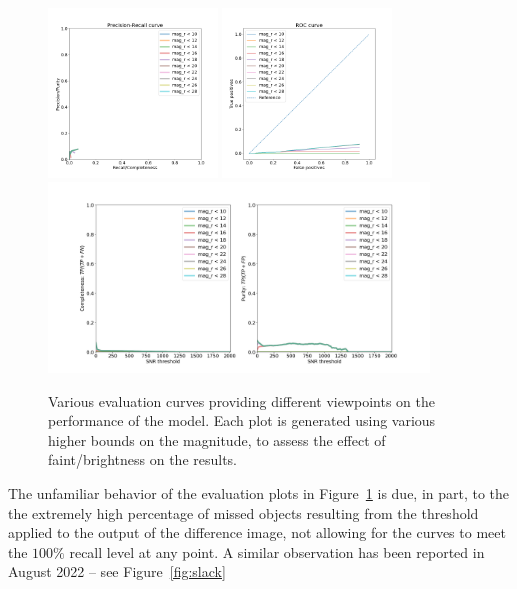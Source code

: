 \documentclass[DM,authoryear,toc]{lsstdoc}
\begin{document}
\begin{figure}[h]
  \centering
  \includegraphics[width=0.4\textwidth]{precision_recall_curve}
  \includegraphics[width=0.4\textwidth]{roc_curve}
  \includegraphics[width=0.9\textwidth]{detection_rate}
  \caption{Various evaluation curves providing different viewpoints on the performance of the model. Each plot is generated using various higher bounds on the magnitude, to assess the effect of faint/brightness on the results.}
  \label{fig:evals}
\end{figure}

The unfamiliar behavior of the evaluation plots in Figure~\ref{fig:evals} is due, in part, to the the extremely high percentage of missed objects resulting from the threshold applied to the output of the difference image, not allowing for the curves to meet the $100\%$ recall level at any point. A similar observation has been reported in August 2022 -- see Figure~\ref{fig:slack}
\end{document}
